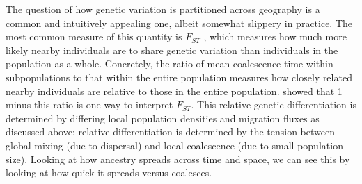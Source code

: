 \documentclass{ar-1col}
\newcommand{\g}[1]{{\color{blue}{#1}}}
\newcommand{\todo}[1]{{\textbf{\color{red}{#1}}}}
\begin{document}
The question of how genetic variation is partitioned across
geography is a common and intuitively appealing one,
albeit somewhat slippery in practice.
The most common measure of this quantity is $F_{ST}$ \citep{Wright1951},
which measures how much more likely nearby individuals are to share genetic variation than individuals in the population as a whole.
Concretely,
the ratio of mean coalescence time within subpopulations
to that within the entire population measures how closely related
nearby individuals are relative to those in the entire population.
\cite{slatkin_1991inbreeding} 
showed that 1 minus this ratio is one way to interpret $F_{ST}$.
This relative genetic differentiation is determined by differing local population densities
and migration fluxes as discussed above:
relative differentiation is determined by the tension between global mixing (due to dispersal)
and local coalescence (due to small population size).
Looking at how ancestry spreads across time and space,
we can see this by looking at how quick it spreads versus coalesces.

\todo{tidy and conclude}

\g{refer to ancestry spread figure to build intuition 
for how ancestors can``forget" where their descendants are, 
leading to an asymptote in ibd}


%
%        
%
%
%
%
\end{document}
